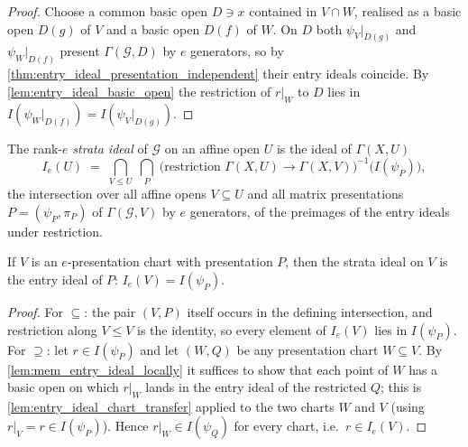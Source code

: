 \begin{proof}
  \leanok
  Choose a common basic open \(D \ni x\) contained in \(V \cap W\), realised
  as a basic open \(D(g)\) of \(V\) and a basic open \(D(f)\) of \(W\).  On
  \(D\) both \(\psi_V|_{D(g)}\) and \(\psi_W|_{D(f)}\) present
  \(\Gamma(\mathcal G, D)\) by \(e\) generators, so by
  \cref{thm:entry_ideal_presentation_independent} their entry ideals coincide.
  By \cref{lem:entry_ideal_basic_open} the restriction of \(r|_W\) to \(D\)
  lies in \(I(\psi_W|_{D(f)}) = I(\psi_V|_{D(g)})\).
\end{proof}

\begin{definition}
  \label{def:strata_ideal}
  \leanok
  The rank-\(e\) \emph{strata ideal} of \(\mathcal G\) on an affine open \(U\)
  is the ideal of \(\Gamma(X, U)\)
  \[
    I_e(U) \;=\; \bigcap_{V \le U} \; \bigcap_{P}
      \; \bigl(\text{restriction } \Gamma(X, U) \to \Gamma(X, V)\bigr)^{-1}
        \bigl(I(\psi_P)\bigr),
  \]
  the intersection over all affine opens \(V \subseteq U\) and all matrix
  presentations \(P = (\psi_P, \pi_P)\) of \(\Gamma(\mathcal G, V)\) by \(e\)
  generators, of the preimages of the entry ideals under restriction.
\end{definition}

\begin{theorem}
  \label{thm:strata_ideal_eq_entry_ideal}
  \leanok
  If \(V\) is an \(e\)-presentation chart with presentation \(P\), then the
  strata ideal on \(V\) is the entry ideal of \(P\): \(I_e(V) = I(\psi_P)\).
\end{theorem}

\begin{proof}
  \leanok
  For \(\subseteq\): the pair \((V, P)\) itself occurs in the defining
  intersection, and restriction along \(V \le V\) is the identity, so every
  element of \(I_e(V)\) lies in \(I(\psi_P)\).  For \(\supseteq\): let
  \(r \in I(\psi_P)\) and let \((W, Q)\) be any presentation chart
  \(W \subseteq V\).  By \cref{lem:mem_entry_ideal_locally} it suffices to
  show that each point of \(W\) has a basic open on which \(r|_W\) lands in the
  entry ideal of the restricted \(Q\); this is
  \cref{lem:entry_ideal_chart_transfer} applied to the two charts \(W\) and
  \(V\) (using \(r|_V = r \in I(\psi_P)\)).  Hence \(r|_W \in I(\psi_Q)\) for
  every chart, i.e.\ \(r \in I_e(V)\).
\end{proof}

